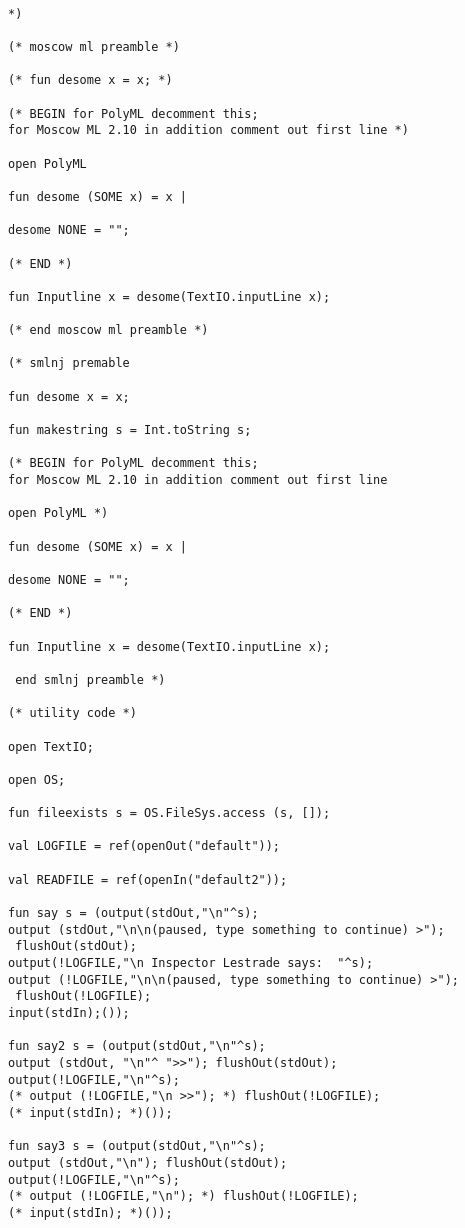 \documentclass[12pt]{article}
\begin{document}
\begin{verbatim}

*)

(* moscow ml preamble *)

(* fun desome x = x; *)

(* BEGIN for PolyML decomment this; 
for Moscow ML 2.10 in addition comment out first line *)

open PolyML

fun desome (SOME x) = x |

desome NONE = "";

(* END *)

fun Inputline x = desome(TextIO.inputLine x);

(* end moscow ml preamble *)

(* smlnj premable 

fun desome x = x;

fun makestring s = Int.toString s;

(* BEGIN for PolyML decomment this; 
for Moscow ML 2.10 in addition comment out first line

open PolyML *)

fun desome (SOME x) = x |

desome NONE = "";

(* END *)

fun Inputline x = desome(TextIO.inputLine x);

 end smlnj preamble *)

(* utility code *)

open TextIO;

open OS;

fun fileexists s = OS.FileSys.access (s, []);

val LOGFILE = ref(openOut("default"));

val READFILE = ref(openIn("default2"));

fun say s = (output(stdOut,"\n"^s);
output (stdOut,"\n\n(paused, type something to continue) >");
 flushOut(stdOut);
output(!LOGFILE,"\n Inspector Lestrade says:  "^s);
output (!LOGFILE,"\n\n(paused, type something to continue) >");
 flushOut(!LOGFILE);
input(stdIn);());

fun say2 s = (output(stdOut,"\n"^s);
output (stdOut, "\n"^ ">>"); flushOut(stdOut);
output(!LOGFILE,"\n"^s);
(* output (!LOGFILE,"\n >>"); *) flushOut(!LOGFILE);
(* input(stdIn); *)());

fun say3 s = (output(stdOut,"\n"^s);
output (stdOut,"\n"); flushOut(stdOut);
output(!LOGFILE,"\n"^s);
(* output (!LOGFILE,"\n"); *) flushOut(!LOGFILE);
(* input(stdIn); *)());


\end{verbatim}
\end{document}
